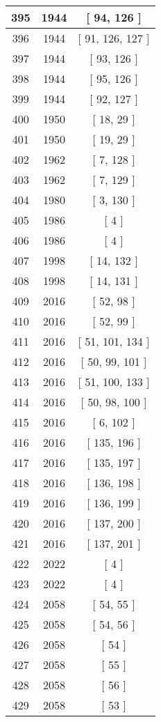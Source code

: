 \begin{center}
\begin{longtable}[H]{|| c c c ||}
\hline
395 & 1944 & [ 94, 126 ] \\ 
\hline
396 & 1944 & [ 91, 126, 127 ] \\ 
\hline
397 & 1944 & [ 93, 126 ] \\ 
\hline
398 & 1944 & [ 95, 126 ] \\ 
\hline
399 & 1944 & [ 92, 127 ] \\ 
\hline
400 & 1950 & [ 18, 29 ] \\ 
\hline
401 & 1950 & [ 19, 29 ] \\ 
\hline
402 & 1962 & [ 7, 128 ] \\ 
\hline
403 & 1962 & [ 7, 129 ] \\ 
\hline
404 & 1980 & [ 3, 130 ] \\ 
\hline
405 & 1986 & [ 4 ] \\ 
\hline
406 & 1986 & [ 4 ] \\ 
\hline
407 & 1998 & [ 14, 132 ] \\ 
\hline
408 & 1998 & [ 14, 131 ] \\ 
\hline
409 & 2016 & [ 52, 98 ] \\ 
\hline
410 & 2016 & [ 52, 99 ] \\ 
\hline
411 & 2016 & [ 51, 101, 134 ] \\ 
\hline
412 & 2016 & [ 50, 99, 101 ] \\ 
\hline
413 & 2016 & [ 51, 100, 133 ] \\ 
\hline
414 & 2016 & [ 50, 98, 100 ] \\ 
\hline
415 & 2016 & [ 6, 102 ] \\ 
\hline
416 & 2016 & [ 135, 196 ] \\ 
\hline
417 & 2016 & [ 135, 197 ] \\ 
\hline
418 & 2016 & [ 136, 198 ] \\ 
\hline
419 & 2016 & [ 136, 199 ] \\ 
\hline
420 & 2016 & [ 137, 200 ] \\ 
\hline
421 & 2016 & [ 137, 201 ] \\ 
\hline
422 & 2022 & [ 4 ] \\ 
\hline
423 & 2022 & [ 4 ] \\ 
\hline
424 & 2058 & [ 54, 55 ] \\ 
\hline
425 & 2058 & [ 54, 56 ] \\ 
\hline
426 & 2058 & [ 54 ] \\ 
\hline
427 & 2058 & [ 55 ] \\ 
\hline
428 & 2058 & [ 56 ] \\ 
\hline
429 & 2058 & [ 53 ] \\ 

\end{longtable}
\end{center}
